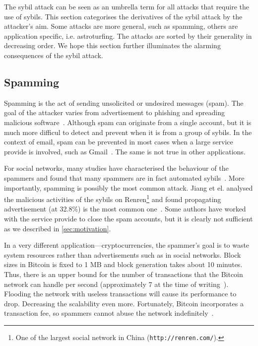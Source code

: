 The sybil attack can be seen as an umbrella term for all attacks that require
the use of sybils. This section categorises the derivatives of the sybil attack
by the attacker's aim. Some attacks are more general, such as spamming, others
are application specific, i.e. astroturfing. The attacks are sorted by their
generality in decreasing order. We hope this section further illuminates the
alarming consequences of the sybil attack.

\subsection{Spamming}
Spamming is the act of sending unsolicited or undesired messages (spam). The
goal of the attacker varies from advertisement to phishing and spreading
malicious software~\cite{twittermalware1, twittermalware2}. Although spam can
originate from a single account, but it is much more difficul to detect and
prevent when it is from a group of sybils. In the context of email, spam can be
prevented in most cases when a large service provide is involved, such as
Gmail~\cite{adwords}. The same is not true in other applications.

For social networks, many studies have characterised the behaviour of the
spammers and found that many spammers are in fact automated
sybils~\cite{stringhini2010detecting, yang2012analyzing, grier2010spam,
  jiang2015understanding}. More importantly, spamming is possibly the most
common attack. Jiang et el. analysed the malicious activities of the sybils on
Renren\footnote{One of the largest social network in China
  (\texttt{http://renren.com/}).} and found propagating advertisement (at
32.8\%) is the most common one~\cite{jiang2015understanding}. Some authors have
worked with the service provide to close the spam accounts, but it is clearly
not sufficient as we described in \autoref{sec:motivation}.

In a very different application---cryptocurrencies, the spammer's goal is to
waste system resources rather than advertisements such as in social networks.
Block sizes in Bitcoin is fixed to 1 MB and block generation takes about 10
minutes. Thus, there is an upper bound for the number of transactions that the
Bitcoin network can handle per second (approximately 7 at the time of
writing~\cite{bitcointps}). Flooding the network with useless transactions will
cause its performance to drop. Decreasing the scalability even more.
Fortunately, Bitcoin incorporates a transaction fee, so spammers cannot abuse
the network indefinitely~\cite{bitcoinspam}.


